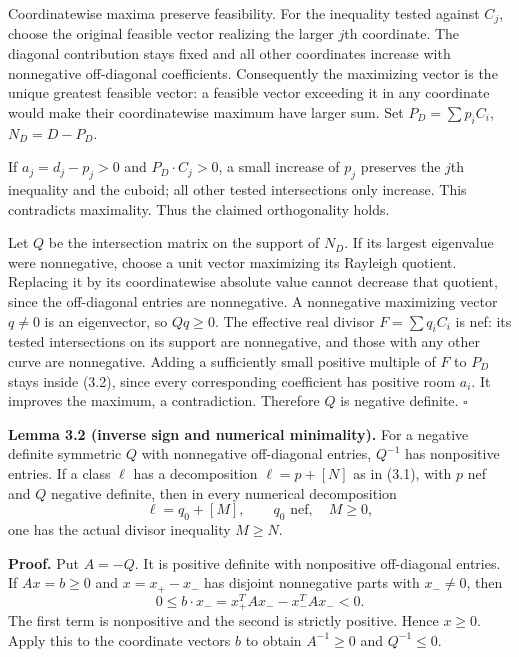 \documentclass[
  10pt,
]{article}
\begin{document}
Coordinatewise maxima preserve feasibility. For the inequality tested
against \(C_j\), choose the original feasible vector realizing the
larger \(j\)th coordinate. The diagonal contribution stays fixed and all
other coordinates increase with nonnegative off-diagonal coefficients.
Consequently the maximizing vector is the unique greatest feasible
vector: a feasible vector exceeding it in any coordinate would make
their coordinatewise maximum have larger sum. Set \(P_D=\sum p_iC_i\),
\(N_D=D-P_D\).

If \(a_j=d_j-p_j>0\) and \(P_D\cdot C_j>0\), a small increase of \(p_j\)
preserves the \(j\)th inequality and the cuboid; all other tested
intersections only increase. This contradicts maximality. Thus the
claimed orthogonality holds.

Let \(Q\) be the intersection matrix on the support of \(N_D\). If its
largest eigenvalue were nonnegative, choose a unit vector maximizing its
Rayleigh quotient. Replacing it by its coordinatewise absolute value
cannot decrease that quotient, since the off-diagonal entries are
nonnegative. A nonnegative maximizing vector \(q\ne0\) is an
eigenvector, so \(Qq\geq0\). The effective real divisor
\(F=\sum q_iC_i\) is nef: its tested intersections on its support are
nonnegative, and those with any other curve are nonnegative. Adding a
sufficiently small positive multiple of \(F\) to \(P_D\) stays inside
(3.2), since every corresponding coefficient has positive room \(a_i\).
It improves the maximum, a contradiction. Therefore \(Q\) is negative
definite. \(\square\)

\textbf{Lemma 3.2 (inverse sign and numerical minimality).} For a
negative definite symmetric \(Q\) with nonnegative off-diagonal entries,
\(Q^{-1}\) has nonpositive entries. If a class \(\ell\) has a
decomposition \(\ell=p+[N]\) as in (3.1), with \(p\) nef and \(Q\)
negative definite, then in every numerical decomposition \[
 \ell=q_0+[M],\qquad q_0\text{ nef},\quad M\geq0,
                                                               \tag{3.3}
\] one has the actual divisor inequality \(M\geq N\).

\textbf{Proof.} Put \(A=-Q\). It is positive definite with nonpositive
off-diagonal entries. If \(Ax=b\geq0\) and \(x=x_+-x_-\) has disjoint
nonnegative parts with \(x_-\ne0\), then \[
 0\leq b\cdot x_-=x_+^TAx_- -x_-^TAx_-<0.
\] The first term is nonpositive and the second is strictly positive.
Hence \(x\geq0\). Apply this to the coordinate vectors \(b\) to obtain
\(A^{-1}\geq0\) and \(Q^{-1}\leq0\).
\end{document}
